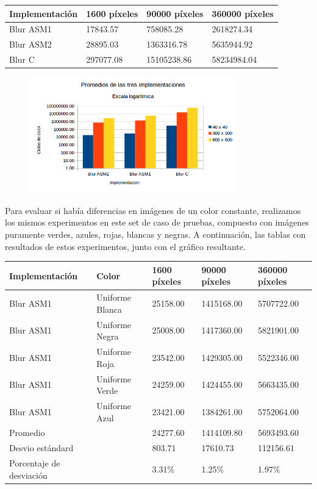 \begin{tabular}{| l | l | l | l|}
\hline
Implementación  & 1600 píxeles & 90000 píxeles & 360000 píxeles\\
\hline
Blur ASM1  & 17843.57 & 758085.28 & 2618274.34\\
\hline
Blur ASM2  & 28895.03 & 1363316.78 & 5635944.92\\
\hline
Blur C & 297077.08 & 15105238.86 & 58234984.04\\
\hline
\end{tabular}

\begin{figure}[ht]
\centering
\includegraphics[width=90mm]{blur/graficoBlur.png}
\end{figure}

Para evaluar si había diferencias en imágenes de un color constante, realizamos los mismos experimentos en este set de caso de pruebas, compuesto con imágenes puramente verdes, azules, rojas, blancas y negras. A continuación, las tablas con resultados de estos experimentos, junto con el gráfico resultante.\\

\begin{tabular}{| l | l | l | l | l |}
\hline
Implementación & Color & 1600 píxeles & 90000 píxeles & 360000 píxeles\\
\hline
Blur ASM1 & Uniforme Blanca & 25158.00 & 1415168.00 & 5707722.00\\ 
\hline
Blur ASM1 & Uniforme Negra & 25008.00 & 1417360.00 & 5821901.00\\ 
\hline
Blur ASM1 & Uniforme Roja & 23542.00 & 1429305.00 & 5522346.00\\ 
\hline
Blur ASM1 & Uniforme Verde & 24259.00 & 1424455.00 & 5663435.00\\
\hline
Blur ASM1 & Uniforme Azul & 23421.00 & 1384261.00 & 5752064.00\\
\hline
Promedio & &  24277.60 & 1414109.80 & 5693493.60\\
\hline
Desvio estándard  &&  803.71 & 17610.73 & 112156.61\\
\hline
Porcentaje de desviación  &&  3.31\% & 1.25\% & 1.97\%\\
\hline
\end{tabular}


